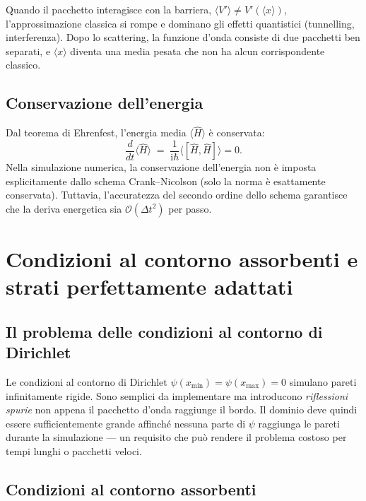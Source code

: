 \documentclass[12pt, a4paper]{article}
\newcommand{\dt}{\Delta t}
\newcommand{\ii}{\mathrm{i}}          %
\newcommand{\CN}{Crank--Nicolson}
\begin{document}
Quando il pacchetto interagisce con la barriera,
$\langle V'\rangle \neq V'(\langle x\rangle)$, l'approssimazione
classica si rompe e dominano gli effetti quantistici (tunnelling,
interferenza).  Dopo lo scattering, la funzione d'onda consiste di
due pacchetti ben separati, e $\langle x\rangle$ diventa una media
pesata che non ha alcun corrispondente classico.

\subsection{Conservazione dell'energia}

Dal teorema di Ehrenfest, l'energia media $\langle\hat{H}\rangle$ è
conservata:
\begin{equation}
  \frac{d}{dt}\langle\hat{H}\rangle \;=\;
  \frac{1}{\ii\hbar}\langle[\hat{H},\hat{H}]\rangle = 0.
\end{equation}
Nella simulazione numerica, la conservazione dell'energia non è
imposta esplicitamente dallo schema \CN{} (solo la norma è
esattamente conservata).  Tuttavia, l'accuratezza del secondo ordine
dello schema garantisce che la deriva energetica sia
$\mathcal{O}(\dt^2)$ per passo.

\section{Condizioni al contorno assorbenti e strati perfettamente adattati}
\label{app:abc}

\subsection{Il problema delle condizioni al contorno di Dirichlet}

Le condizioni al contorno di Dirichlet
$\psi(x_\text{min}) = \psi(x_\text{max}) = 0$ simulano pareti
infinitamente rigide.  Sono semplici da implementare ma introducono
\emph{riflessioni spurie} non appena il pacchetto d'onda raggiunge
il bordo.  Il dominio deve quindi essere sufficientemente grande
affinché nessuna parte di $\psi$ raggiunga le pareti durante la
simulazione --- un requisito che può rendere il problema costoso per
tempi lunghi o pacchetti veloci.

\subsection{Condizioni al contorno assorbenti}
\end{document}
